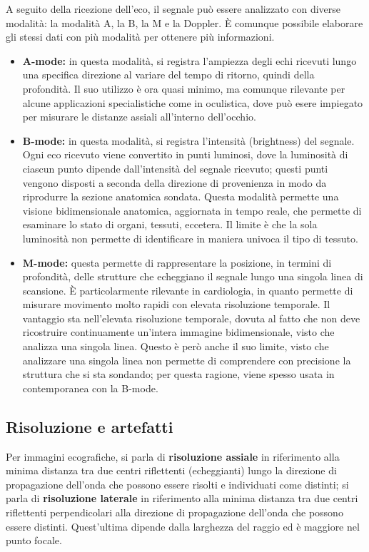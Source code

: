 \documentclass[11pt, a4paper]{scrartcl}
\theoremstyle{style}
\theoremstyle{style1}
\numberwithin{equation}{subsection}
\begin{document}
A seguito della ricezione dell'eco, il segnale pu\`o essere analizzato con diverse modalit\`a: la modalità A, la B, la M e la Doppler.
\`E comunque possibile elaborare gli stessi dati con pi\`u modalit\`a per ottenere pi\`u informazioni.
\begin{itemize}
	\item \textbf{A-mode:} in questa modalit\`a, si registra l'ampiezza degli echi ricevuti lungo una specifica direzione al variare del tempo di ritorno, quindi della profondit\`a.
		Il suo utilizzo \`e ora quasi minimo, ma comunque rilevante per alcune applicazioni specialistiche come in oculistica, dove pu\`o esere impiegato per misurare le distanze assiali all'interno dell'occhio.
	\item \textbf{B-mode:} in questa modalit\`a, si registra l'intensit\`a (brightness) del segnale.
		Ogni eco ricevuto viene convertito in punti luminosi, dove la luminosit\`a di ciascun punto dipende dall'intensit\`a del segnale ricevuto; questi punti vengono disposti a seconda della direzione di provenienza in modo da riprodurre la sezione anatomica sondata.
		Questa modalit\`a permette una visione bidimensionale anatomica, aggiornata in tempo reale, che permette di esaminare lo stato di organi, tessuti, eccetera.
		Il limite \`e che la sola luminosit\`a non permette di identificare in maniera univoca il tipo di tessuto.
	\item \textbf{M-mode:} questa permette di rappresentare la posizione, in termini di profondit\`a, delle strutture che echeggiano il segnale lungo una singola linea di scansione.
		\`E particolarmente rilevante in cardiologia, in quanto permette di misurare movimento molto rapidi con elevata risoluzione temporale.
		Il vantaggio sta nell'elevata risoluzione temporale, dovuta al fatto che non deve ricostruire continuamente un'intera immagine bidimensionale, visto che analizza una singola linea.
		Questo \`e per\`o anche il suo limite, visto che analizzare una singola linea non permette di comprendere con precisione la struttura che si sta sondando; per questa ragione, viene spesso usata in contemporanea con la B-mode.
\end{itemize}

\subsection{Risoluzione e artefatti}

Per immagini ecografiche, si parla di \textbf{risoluzione assiale} in riferimento alla minima distanza tra due centri riflettenti (echeggianti) lungo la direzione di propagazione dell'onda che possono essere risolti e individuati come distinti; si parla di \textbf{risoluzione laterale} in riferimento alla minima distanza tra due centri riflettenti perpendicolari alla direzione di propagazione dell'onda che possono essere distinti.
Quest'ultima dipende dalla larghezza del raggio ed \`e maggiore nel punto focale.
\end{document}
